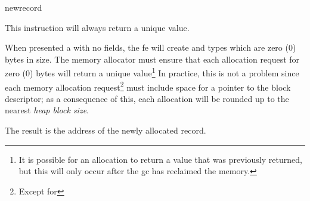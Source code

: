\begin{instruction}{newrecord}

  \begin{notes}
    This instruction will always return a unique value.  

    When presented a  with no fields, the \ac{fe} will
    create  and  types which are zero (0)
    bytes in size.  The memory allocator must ensure that each
    allocation request for zero (0) bytes will return a unique
    value\footnote{It is possible for an allocation to return a value
      that was previously returned, but this will only occur after the
      \ac{gc} has reclaimed the memory.}  In practice, this is not a
    problem since each memory allocation request\footnote{Except for
      } must include space for a pointer to the block
    descriptor; as a consequence of this, each allocation will be
    rounded up to the nearest \emph{heap block size}.
  \end{notes}

  \begin{results}
  \item The result is the address of the newly allocated record.
  \end{results}

  \begin{operands}
  \item {}
  \end{operands}
\end{instruction}

